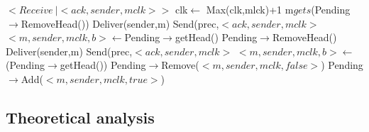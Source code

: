 \documentclass[a4paper]{article}
\begin{document}
        \begin{algorithm}[H]
            \centering
            \begin{algorithmic}[5]

                \Event $<Receive\  | <ack,sender, mclk>>$
                \State clk$\gets$ Max(clk,mlck)+1
                \State m$gets$(Pending$\rightarrow$RemoveHead())
                \State Deliver(sender,m)
                \State Send(prec,$<ack,sender,mclk>$
                \EndIf
                \State $<m,sender,mclk,b>\gets$Pending$\rightarrow$getHead()
                \State Pending$\rightarrow$RemoveHead()
                \State Deliver(sender,m)
                \State Send(prec,$<ack,sender,mclk>$
                \EndIf
                \State $<m,sender,mclk,b>\gets$(Pending$\rightarrow$getHead())
                \EndWhile
                \Else
                \State Pending$\rightarrow$Remove($<m,sender,mclk,false>$)
                \State Pending$\rightarrow$Add($<m,sender,mclk,true>$)
                \EndIf
                \EndEvent
            \end{algorithmic}
        \end{algorithm}


        \subsection{Theoretical analysis}
\end{document}
